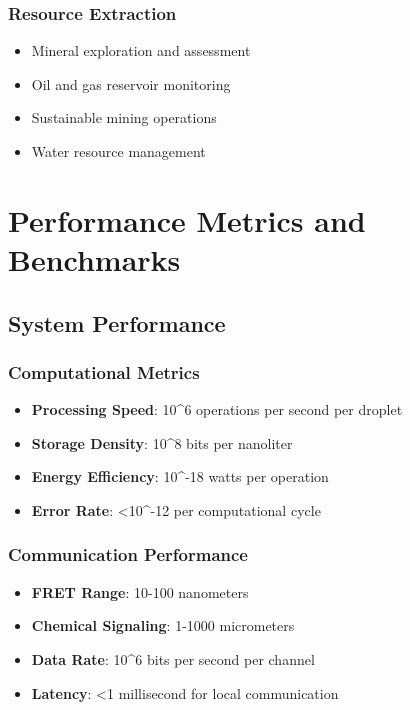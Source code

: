 \documentclass[11pt,a4paper]{article}
\begin{document}
\subsubsection{Resource Extraction}
\begin{itemize}
    \item Mineral exploration and assessment
    \item Oil and gas reservoir monitoring
    \item Sustainable mining operations
    \item Water resource management
\end{itemize}

\section{Performance Metrics and Benchmarks}

\subsection{System Performance}

\subsubsection{Computational Metrics}
\begin{itemize}
    \item \textbf{Processing Speed}: 10\^{}6 operations per second per droplet
    \item \textbf{Storage Density}: 10\^{}8 bits per nanoliter
    \item \textbf{Energy Efficiency}: 10\^{}-18 watts per operation
    \item \textbf{Error Rate}: <10\^{}-12 per computational cycle
\end{itemize}

\subsubsection{Communication Performance}
\begin{itemize}
    \item \textbf{FRET Range}: 10-100 nanometers
    \item \textbf{Chemical Signaling}: 1-1000 micrometers
    \item \textbf{Data Rate}: 10\^{}6 bits per second per channel
    \item \textbf{Latency}: <1 millisecond for local communication
\end{itemize}
\end{document}
